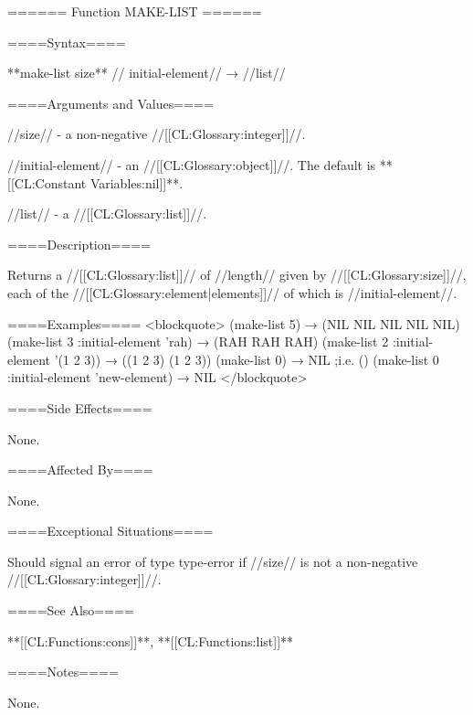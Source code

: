 ====== Function MAKE-LIST ======

====Syntax====

**make-list {size** //\key} initial-element// → //list//

====Arguments and Values====

//size// - a non-negative //[[CL:Glossary:integer]]//.

//initial-element// - an //[[CL:Glossary:object]]//. The default is **[[CL:Constant Variables:nil]]**.

//list// - a //[[CL:Glossary:list]]//.

====Description====

Returns a //[[CL:Glossary:list]]// of //length// given by //[[CL:Glossary:size]]//, each of the //[[CL:Glossary:element|elements]]// of which is //initial-element//.

====Examples==== <blockquote> (make-list 5) → (NIL NIL NIL NIL NIL) (make-list 3 :initial-element 'rah) → (RAH RAH RAH) (make-list 2 :initial-element '(1 2 3)) → ((1 2 3) (1 2 3)) (make-list 0) → NIL ;i.e. () (make-list 0 :initial-element 'new-element) → NIL </blockquote>

====Side Effects====

None.

====Affected By====

None.

====Exceptional Situations====

Should signal an error of type type-error if //size// is not a non-negative //[[CL:Glossary:integer]]//.

====See Also====

**[[CL:Functions:cons]]**, **[[CL:Functions:list]]**

====Notes====

None.

